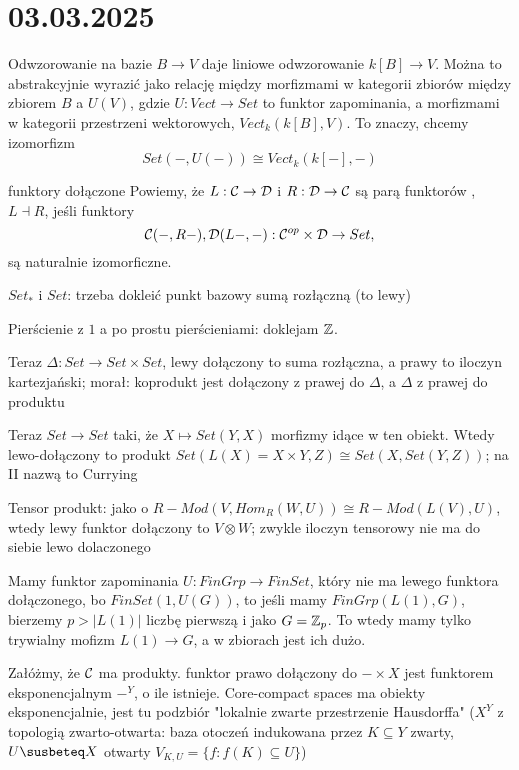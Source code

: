 \section{03.03.2025}{}


Odwzorowanie na bazie $B\to V$ daje liniowe odwzorowanie $k[B]\to V$. Można to abstrakcyjnie wyrazić jako relację między morfizmami w kategorii zbiorów między zbiorem $B$ a $U(V)$, gdzie $U:Vect\to Set$ to funktor zapominania, a morfizmami w kategorii przestrzeni wektorowych, $Vect_k(k[B], V)$. To znaczy, chcemy izomorfizm
$$Set(-, U(-))\cong Vect_k(k[-], -)$$

\begin{definition}{funktory dołączone}{}
  Powiemy, że $L:\mathcal{C}\to \mathcal{D}$ i $R:\mathcal{D}\to \mathcal{C}$ są parą funktorów , $L\dashv R$, jeśli funktory
  $$\mathcal{C}(-, R-), \mathcal{D}(L-, -):\mathcal{C}^{op}\times\mathcal{D}\to Set,$$
  są naturalnie izomorficzne.
\end{definition}

$Set_*$ i $Set$: trzeba dokleić punkt bazowy sumą rozłączną (to lewy)

Pierścienie z $1$ a po prostu pierścieniami: doklejam $\mathbb{Z}$.

Teraz $\Delta:Set\to Set\times Set$, lewy dołączony to suma rozłączna, a prawy to iloczyn kartezjański; morał: koprodukt jest dołączony z prawej do $\Delta$, a $\Delta$ z prawej do produktu

Teraz $Set\to Set$ taki, że $X\mapsto Set(Y, X)$ morfizmy idące w ten obiekt. Wtedy lewo-dołączony to produkt $Set(L(X)=X\times Y, Z)\cong Set(X, Set(Y, Z))$; na II nazwą to Currying


Tensor produkt: jako o $R-Mod(V, Hom_R(W, U))\cong R-Mod(L(V), U)$, wtedy lewy funktor dołączony to $V\otimes W$; zwykle iloczyn tensorowy nie ma do siebie lewo dolaczonego

Mamy funktor zapominania $U:FinGrp\to FinSet$, który nie ma lewego funktora dołączonego, bo $FinSet(1, U(G))$, to jeśli mamy $FinGrp(L(1), G)$, bierzemy $p>|L(1)|$ liczbę pierwszą i jako $G=\mathbb{Z}_p$. To wtedy mamy tylko trywialny mofizm $L(1)\to G$, a w zbiorach jest ich dużo.

Załóżmy, że $\mathcal{C}$ ma produkty. funktor prawo dołączony do $-\times X$ jest funktorem eksponencjalnym $-^Y$, o ile istnieje. Core-compact spaces ma obiekty eksponencjalnie, jest tu podzbiór "lokalnie zwarte przestrzenie Hausdorffa" ($X^Y$ z topologią zwarto-otwarta: baza otoczeń indukowana przez $K\subseteq Y$ zwarty, $U\susbeteq X$ otwarty $V_{K,U}=\{f:f(K)\subseteq U\}$)

